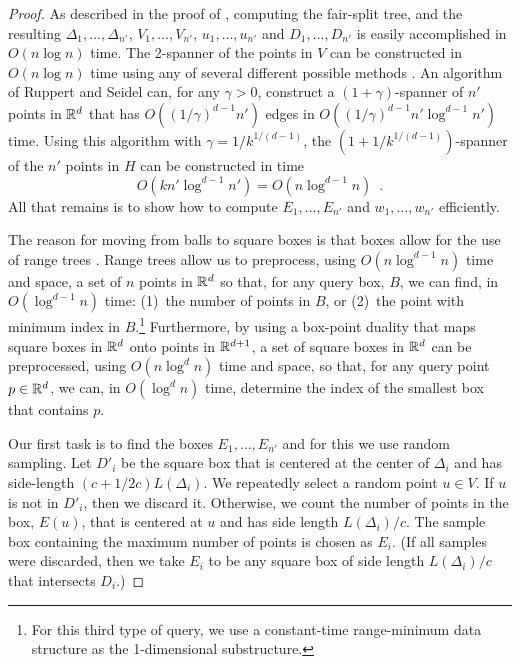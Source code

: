 \documentclass{patmorin}
\begin{document}
\begin{proof}
  As described in the proof of , computing the
  fair-split tree, and the resulting $\Delta_1,\ldots,\Delta_{n'}$,
  $V_1,\ldots,V_{n'}$, $u_1,\ldots,u_{n'}$ and $D_1,\ldots,D_{n'}$
  is easily accomplished in $O(n\log n)$ time.  The 2-spanner
  of the points in $V$ can be constructed in $O(n\log
  n)$ time using any of several different possible methods
  \cite{callahan.kosaraju:faster,salowe:constructing,vaidya:sparse}.
  An algorithm of Ruppert and Seidel \cite{ruppert.seidel:approximating}
  can, for any $\gamma >0$, construct a $(1+\gamma)$-spanner of
  $n'$ points in $\mathbb{R}^d$ that has $O((1/\gamma)^{d-1}n')$ edges in
  $O((1/\gamma)^{d-1} n'\log^{d-1} n')$ time.  Using this algorithm with
  $\gamma=1/k^{1/(d-1)}$, the $(1+1/k^{1/(d-1)})$-spanner of the $n'$
  points in $H$ can be constructed in time
  \[
     O(kn'\log^{d-1} n') = O(n\log^{d-1} n) \enspace .
  \]
  All that remains is to show how to compute $E_1,\ldots,E_{n'}$ and
  $w_1,\ldots,w_{n'}$ efficiently.

  The reason for moving from balls to square boxes is that boxes allow for
  the use of range trees \cite{bentley:multidimensional,luecker:data}.
  Range trees allow us to preprocess, using $O(n\log^{d-1} n)$ time and
  space, a set of $n$ points in $\mathbb{R}^d$ so that, for any query box, $B$,
  we can find, in $O(\log^{d-1} n)$ time: (1)~the number of points in $B$,
  or (2)~the point with minimum index in $B$.\footnote{For this third
  type of query, we use a constant-time range-minimum data structure
  \cite{bender.farach-colton:lca} as the 1-dimensional substructure.}
  Furthermore, by using a box-point duality that maps square boxes in
  $\mathbb{R}^d$ onto points in $\mathbb{R}^{d+1}$, a set of square boxes in $\mathbb{R}^d$
  can be preprocessed, using $O(n\log^d n)$ time and space, so that, for
  any query point $p\in\mathbb{R}^d$, we can, in $O(\log^d n)$ time, determine
  the index of the smallest box that contains $p$.

  Our first task is to find the boxes $E_1,\ldots,E_{n'}$ and for
  this we use random sampling.  Let $D'_{i}$ be the square box
  that is centered at the center of $\Delta_i$ and has side-length
  $(c+1/2c)L(\Delta_i)$.  We repeatedly select a random point $u\in V$.
  If $u$ is not in $D'_i$, then we discard it.  Otherwise, we count the
  number of points in the box, $E(u)$, that is centered at $u$ and has
  side length $L(\Delta_i)/c$.  The sample box containing the maximum
  number of points is chosen as $E_i$.  (If all samples were discarded,
  then we take $E_i$ to be any square box of side length $L(\Delta_i)/c$
  that intersects $D_i$.)


\end{proof}
\end{document}
